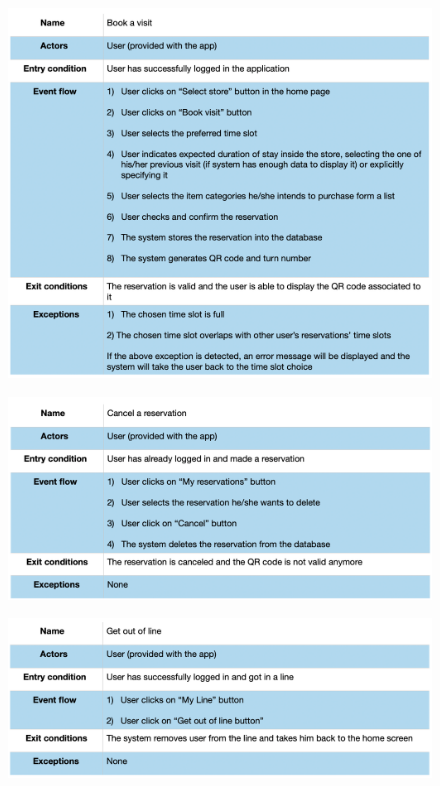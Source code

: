 \documentclass{article}
\begin{document}
\begin{figure}[H]
  \includegraphics[width=\linewidth]{BookVisitUseCase.png}
  
\end{figure}

\begin{figure}[H]
  \includegraphics[width=\linewidth]{CancelReservationUseCase.png}
  
\end{figure}

\begin{figure}[H]
  \includegraphics[width=\linewidth]{GetOutLineUseCase.png}
  
\end{figure}
\end{document}
